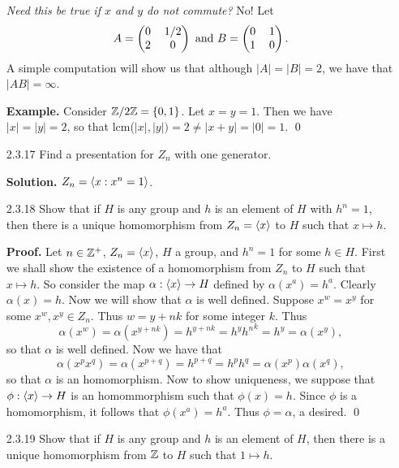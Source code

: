 \begin{enumerate}
      \textit{Need this be true if $x$ and $y$ do not commute?} No! Let
      $$
         A = \left(\begin{tabular}{@{}cc@{}}
            0 & 1/2 \\
            2 & 0
         \end{tabular}\right) \text{ and }
         B = \left(\begin{tabular}{@{}cc@{}}
            0 & 1 \\
            1 & 0
         \end{tabular}\right).
      $$
      A simple computation will show us that although $|A| = |B| = 2$, we have
      that $|AB| = \infty$.
      
      \textbf{Example.} Consider $\mathbb{Z}/2\mathbb{Z} = \{0, 1\}$. Let $x = y = 1$. Then we
      have $|x| = |y| = 2$, so that lcm($|x|, |y|) = 2 \neq |x + y| = |0| = 1$.
      \qed
   \item[2.3.17]  Find a presentation for $Z_n$ with one generator.
   
      \textbf{Solution.} $Z_n = \langle x : x^n = 1 \rangle$.
   \item[2.3.18]  Show that if $H$ is any group and $h$ is an element of $H$
                  with $h^n = 1$, then there is a unique homomorphism from
                  $Z_n = \langle x \rangle$ to $H$ such that $x \mapsto h$.
                  
      \textbf{Proof.} Let $n \in \mathbb{Z}^+$, $Z_n = \langle x \rangle$, $H$ a group, and
      $h^n  = 1$ for some $h \in H$. First we shall show the existence of a
      homomorphism from $Z_n$ to $H$ such that $x \mapsto h$. So consider the
      map $\alpha : \langle x \rangle \rightarrow H$ defined by $\alpha(x^a) = h^a$.
      Clearly $\alpha(x) = h$. Now we will show that $\alpha$ is well defined.
      Suppose $x^w = x^y$ for some $x^w, x^y \in Z_n$. Thus $w = y + nk$ for
      some integer $k$. Thus
      $$\alpha(x^w) = \alpha(x^{y+nk})=h^{y+nk}=h^{y}{h^n}^k =h^y=\alpha(x^y),$$
      so that $\alpha$ is well defined. Now we have that
      $$\alpha(x^px^q)=\alpha(x^{p+q})=h^{p+q}=h^ph^q=\alpha(x^p)\alpha(x^q),$$
      so that $\alpha$ is an homomorphism. Now to show uniqueness, we suppose
      that $\phi : \langle x \rangle \rightarrow H$ is an homommorphism such that
      $\phi(x) = h$. Since $\phi$ is a homomorphism, it follows that
      $\phi(x^a) = h^a$. Thus $\phi = \alpha$, a desired. \qed
   \item[2.3.19]  Show that if $H$ is any group and $h$ is an element of $H$,
                  then there is a unique homomorphism from $\mathbb{Z}$ to $H$ such that
                  $1 \mapsto h$.
                  

\end{enumerate}
